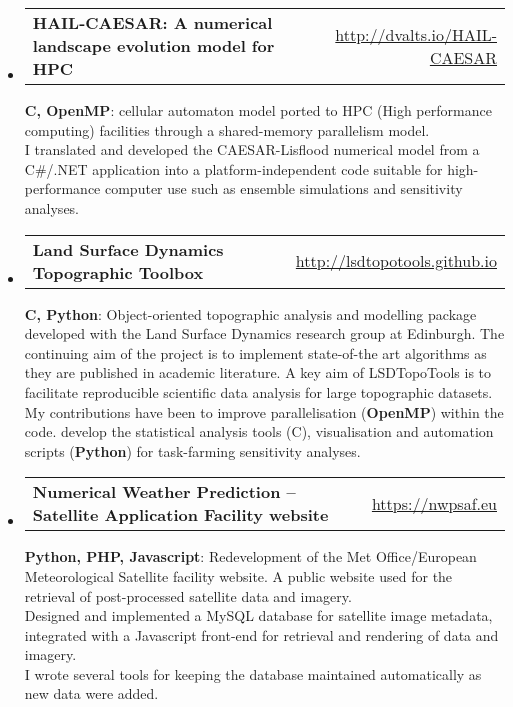 \documentclass[10.5pt,a4]{article}
\makeatletter
\newcommand{\headerrow}[2]
{\begin{tabular*}{\linewidth}{l@{\extracolsep{\fill}}r}
	#1 &
	#2 \\
\end{tabular*}}
\newcommand{\CPP}
{C\nolinebreak[4]\hspace{-.05em}\raisebox{.22ex}{\footnotesize\bf ++}}
\makeatother
\begin{document}
\begin{itemize}
	\item
	\headerrow
		{\textbf{HAIL-CAESAR: A numerical landscape evolution model for HPC}}
		{\url{http://dvalts.io/HAIL-CAESAR}}

		\textbf{{\CPP}, OpenMP}: cellular automaton model ported to HPC (High performance computing) facilities through a shared-memory parallelism model. \\
		I translated and developed the CAESAR-Lisflood numerical model from a C{\#}/.NET application into a platform-independent code suitable for high-performance computer use such as ensemble simulations and sensitivity analyses. 


	\item
	\headerrow
		{\textbf{Land Surface Dynamics Topographic Toolbox}}
		{\url{http://lsdtopotools.github.io}}

		\textbf{{\CPP}, Python}: Object-oriented topographic analysis and modelling package developed with the Land Surface Dynamics research group at Edinburgh. The continuing aim of the project is to implement state-of-the art algorithms as they are published in academic literature. A key aim of LSDTopoTools is to facilitate reproducible scientific data analysis for large topographic datasets. \\
		My contributions have been to improve parallelisation (\textbf{OpenMP}) within the code. develop the statistical analysis tools (\CPP), visualisation and automation scripts (\textbf{Python}) for task-farming sensitivity analyses.
	
	\item
	\headerrow
		{\textbf{Numerical Weather Prediction -- Satellite Application Facility website}}
		{\url{https://nwpsaf.eu}}

		\textbf{Python, PHP, Javascript}: Redevelopment of the Met Office/European Meteorological Satellite facility website. A public website used for the retrieval of post-processed satellite data and imagery. \\
		Designed and implemented a MySQL database for satellite image metadata, integrated with a Javascript front-end for retrieval and rendering of data and imagery. \\
		I wrote several tools for keeping the database maintained automatically as new data were added. 

\end{itemize}
\end{document}
